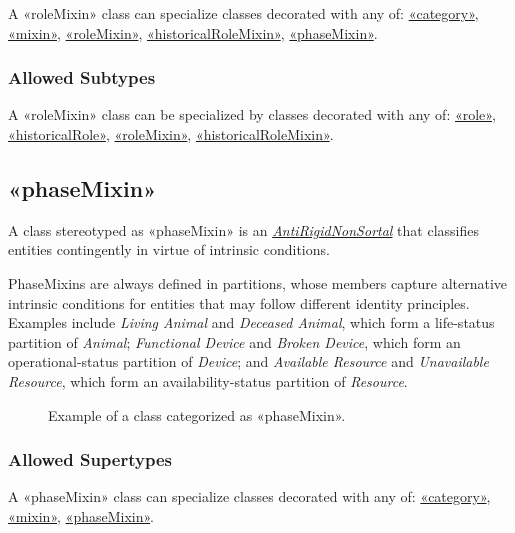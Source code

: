 A «roleMixin» class can specialize classes decorated with any of: 
\hyperref[stereotype:category]{«category»}, \hyperref[stereotype:mixin]{«mixin»}, \hyperref[stereotype:roleMixin]{«roleMixin»}, \hyperref[stereotype:historicalRoleMixin]{«historicalRoleMixin»}, \hyperref[stereotype:phaseMixin]{«phaseMixin»}.

\subsubsection{Allowed Subtypes}

A «roleMixin» class can be specialized by classes decorated with any of:
\hyperref[stereotype:role]{«role»}, \hyperref[stereotype:historicalRole]{«historicalRole»}, \hyperref[stereotype:roleMixin]{«roleMixin»}, \hyperref[stereotype:historicalRoleMixin]{«historicalRoleMixin»}.

\subsection{«phaseMixin»}
\label{stereotype:phaseMixin}

A class stereotyped as «phaseMixin» is an \hyperref[stereotype:antiRigidNonSortal]{\textit{AntiRigidNonSortal}} that classifies entities contingently in virtue of intrinsic conditions.

PhaseMixins are always defined in partitions, whose members capture alternative intrinsic conditions for entities that may follow different identity principles. Examples include \textit{Living Animal} and \textit{Deceased Animal}, which form a life-status partition of \textit{Animal}; \textit{Functional Device} and \textit{Broken Device}, which form an operational-status partition of \textit{Device}; and \textit{Available Resource} and \textit{Unavailable Resource}, which form an availability-status partition of \textit{Resource}.


\begin{figure}[h]
    \centering
    
    \caption{Example of a class categorized as «phaseMixin».}
    \label{fig:phaseMixin-example}
\end{figure}


\subsubsection{Allowed Supertypes}

A «phaseMixin» class can specialize classes decorated with any of: 
\hyperref[stereotype:category]{«category»}, \hyperref[stereotype:mixin]{«mixin»}, \hyperref[stereotype:phaseMixin]{«phaseMixin»}.


